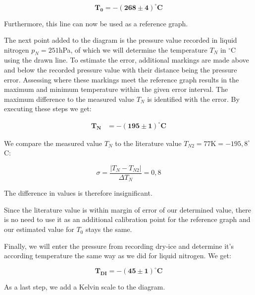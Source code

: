 \documentclass{article}
\begin{document}
\begin{equation}
    \bm{T_0} = \bm{-(268 \pm 4)^{\circ}} \textbf{C}
\end{equation}

Furthermore, this line can now be used as a reference graph.

The next point added to the diagram is the pressure value recorded in liquid nitrogen $p_N = 251$hPa, of which we will determine the temperature $T_{N}$ in $^{\circ}$C using the drawn line. To estimate the error, additional markings are made above and below the recorded pressure value with their distance being the pressure error. Assessing where these markings meet the reference graph results in the maximum and minimum temperature within the given error interval. The maximum difference to the measured value $T_{N}$ is identified with the error. By executing these steps we get:

\begin{equation}
    \begin{split}
        \bm{T_N} &= \bm{-(195 \pm 1)^{\circ}\textbf{C}}
    \end{split}
\end{equation}


We compare the measured value $T_{N}$ to the literature value $T_{N2} = 77\text{K} = -195,8^{\circ}$C:

\begin{equation}
    \sigma = \frac{\left| T_{N} - T_{N2} \right|}{\Delta T_{N}} = 0,8
\end{equation}

The difference in values is therefore insignificant.

Since the literature value is within margin of error of our determined value, there is no need to use it as an additional calibration point for the reference graph and our estimated value for $T_0$ stays the same.

Finally, we will enter the pressure from recording dry-ice and determine it's according temperature the same way as we did for liquid nitrogen. We get:

\begin{equation}
    \bm{T_{DI}} = \bm{-(45 \pm 1)^{\circ}\textbf{C}}
\end{equation}

As a last step, we add a Kelvin scale to the diagram.
\end{document}

